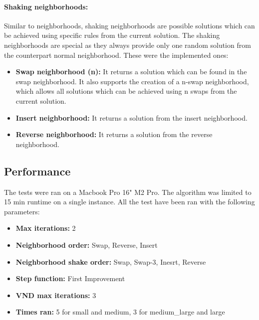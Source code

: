 \documentclass{article}
\begin{document}
\paragraph{Shaking neighborhoods:}
Similar to neighborhoods, shaking neighborhoods are possible solutions which can be achieved using specific rules from the current solution. The shaking neighborhoods are special as they always provide only one random solution from the counterpart normal neighborhood. These were the implemented ones:
\begin{itemize}
	\item \textbf{Swap neighborhood (n):} It returns a solution which can be found in the swap neighborhood. It also supports the creation of a n-swap neighborhood, which allows all solutions which can be achieved using n swaps from the current solution.
	\item \textbf{Insert neighborhood:} It returns a solution from the insert neighborhood.
	\item \textbf{Reverse neighborhood:} It returns a solution from the reverse neighborhood.
\end{itemize}

\subsection*{Performance}
The tests were ran on a Macbook Pro 16" M2 Pro.  The algorithm was limited to 15 min runtime on a single instance. All the test have been ran with the following parameters: 
\begin{itemize}
	\item \textbf{Max iterations:} 2
	\item \textbf{Neighborhood order:} Swap, Reverse, Insert
	\item \textbf{Neighborhood shake order:} Swap, Swap-3, Inesrt, Reverse
	\item \textbf{Step function:} First Improvement
	\item \textbf{VND max iterations:} 3
	\item \textbf{Times ran:} 5 for small and medium, 3 for medium\_large and large
\end{itemize}
\end{document}
